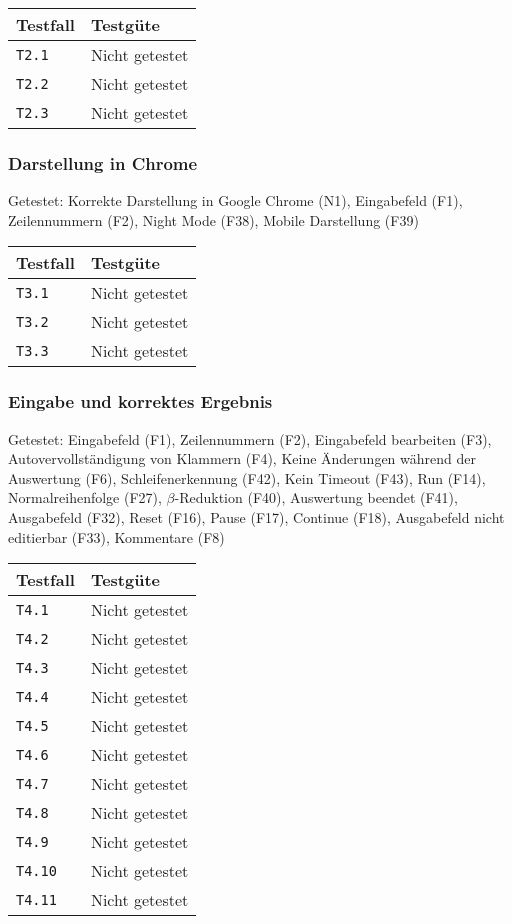 \documentclass[parskip=full,11pt,twoside]{scrartcl}
\newcommand{\testline}[2]{
    \texttt{#1} & 
    \ifthenelse{\equal{#2}{Nicht getestet}}
        {\cellcolor{red!20}}
        {}
    \ifthenelse{\equal{#2}{Manuell getestet}}
        {\cellcolor{orange!20}}
        {}
    \ifthenelse{\equal{#2}{Automatisiert getestet}}
        {\cellcolor{green!20}}
        {}
    #2 \\ \hline
}
\begin{document}
    \label{shortcuts}
    \begin{center}
        \begin{tabular}{ p{9cm} p{4cm}}
            Testfall & Testgüte \\ \hline
            \testline{T2.1}{Nicht getestet}
            \testline{T2.2}{Nicht getestet}
            \testline{T2.3}{Nicht getestet}
        \end{tabular}
    \end{center}

\subsubsection{Darstellung in Chrome}
    Getestet:
    Korrekte Darstellung in Google Chrome (N1),
    Eingabefeld (F1),
    Zeilennummern (F2),
    Night Mode (F38),
    Mobile Darstellung (F39)

    \label{shortcuts}
    \begin{center}
        \begin{tabular}{ p{9cm} p{4cm}}
            Testfall & Testgüte \\ \hline
            \testline{T3.1}{Nicht getestet}
            \testline{T3.2}{Nicht getestet}
            \testline{T3.3}{Nicht getestet}
        \end{tabular}
    \end{center}

\subsubsection{Eingabe und korrektes Ergebnis}
    Getestet:
    Eingabefeld (F1),
    Zeilennummern (F2),
    Eingabefeld bearbeiten (F3),
    Autovervollständigung von Klammern (F4),
    Keine Änderungen während der Auswertung (F6),
    Schleifenerkennung (F42),
    Kein Timeout (F43),
    Run (F14),
    Normalreihenfolge (F27),
    $\beta$-Reduktion (F40),
    Auswertung beendet (F41),
    Ausgabefeld (F32),
    Reset (F16),
    Pause (F17),
    Continue (F18),
    Ausgabefeld nicht editierbar (F33),
    Kommentare (F8)

    \label{shortcuts}
    \begin{center}
        \begin{tabular}{ p{9cm} p{4cm}}
            Testfall & Testgüte \\ \hline
            \testline{T4.1}{Nicht getestet}
            \testline{T4.2}{Nicht getestet}
            \testline{T4.3}{Nicht getestet}
            \testline{T4.4}{Nicht getestet}
            \testline{T4.5}{Nicht getestet}
            \testline{T4.6}{Nicht getestet}
            \testline{T4.7}{Nicht getestet}
            \testline{T4.8}{Nicht getestet}
            \testline{T4.9}{Nicht getestet}
            \testline{T4.10}{Nicht getestet}
            \testline{T4.11}{Nicht getestet}
        \end{tabular}
    \end{center}
\end{document}

